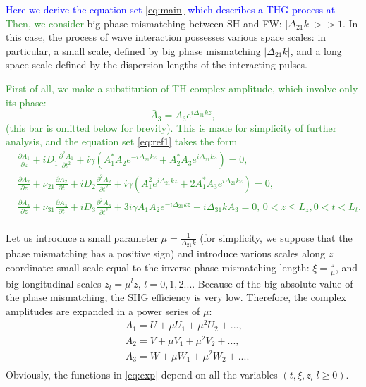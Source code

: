 \documentclass[a4paper, 12pt, onecolumn]{extarticle}
\begin{document}
\textcolor{blue}{Here we derive the equation set \eqref{eq:main} which describes a THG process at } \textcolor{ForestGreen}{Then, we consider} big phase mismatching between SH and FW: \(|\Delta_{21}k|>>1\). In this case, the process of wave interaction possesses various space scales: in particular, a small scale, defined by big phase mismatching \(|\Delta_{21}k|\), and a long space scale defined by the dispersion lengths of the interacting pulses. 

\textcolor{ForestGreen}{
First of all, we make a substitution of TH complex amplitude, which involve only its phase:
$$
\bar{A}_3=A_3e^{i\Delta_{31}kz},
$$
(this bar is omitted below for brevity). This is made for simplicity of further analysis, and the equation set \eqref{eq:ref1} takes the form
\begin{equation}
\label{eq:refg}
\begin{aligned}
&\frac{\partial{A_1}}{\partial{z}}+iD_1\frac{\partial^2{A_1}}{\partial{t^2}}+i\gamma\left(A_1^* A_2e^{-i\Delta_{21} kz}+A_2^* A_3e^{i\Delta_{21}kz}\right)=0,\\
&\frac{\partial{A_2}}{\partial{z}}+\nu_{21}\frac{\partial A_2}{\partial t}+iD_2\frac{\partial^2{A_2}}{\partial{t^2}}+i\gamma\left(A_1^2e^{i\Delta_{21} kz}+2A_1^*A_3e^{i\Delta_{21}kz}\right)=0,\\
&\frac{\partial{A_3}}{\partial{z}}+\nu_{31}\frac{\partial A_3}{\partial t}+iD_3\frac{\partial^2{A_3}}{\partial{t^2}}+3i\gamma A_1 A_2e^{-i\Delta_{21}kz}+i\Delta_{31}kA_3=0,\,0< z \leq L_z , 0<t<L_t.\\
\end{aligned}\end{equation}
}

Let us introduce a small parameter \(\mu=\frac{1}{\Delta_{21}k}\) (for simplicity, we suppose that the phase mismatching has a positive sign) and introduce various scales along \(z\) coordinate: small scale equal to the inverse phase mismatching length: \(\xi=\frac{z}{\mu}\), and big longitudinal scales \(z_l=\mu^lz,\,l=0,1,2...\). Because of the big absolute value of the phase mismatching, the SHG efficiency is very low. Therefore, the complex amplitudes are expanded in a power series of \(\mu\):
\begin{equation}
\label{eq:exp}
\begin{aligned}
&A_1=U+\mu U_1 +\mu^2 U_2 +...,\\
&A_2=V+\mu V_1 + \mu^2 V_2 +...,\\
&A_3=W+\mu W_1 + \mu^2 W_2+....\\
\end{aligned}
\end{equation}
Obviously, the functions in \eqref{eq:exp} depend on all the variables \((t,\xi,z_l|l\ge0)\).
\end{document}
